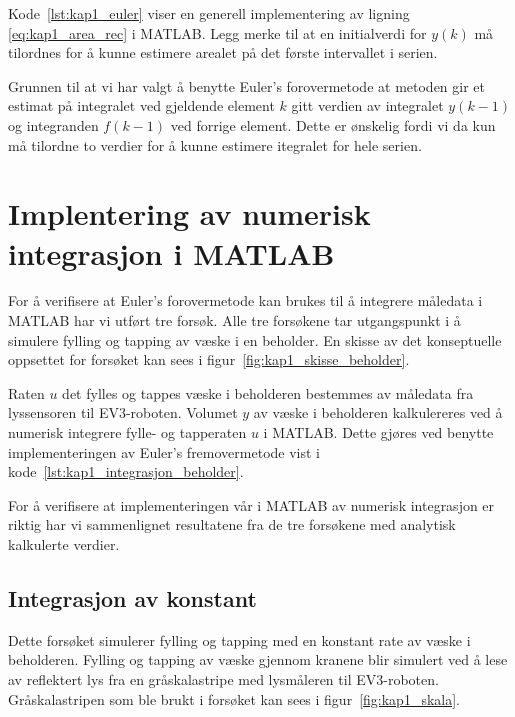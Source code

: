 \documentclass[main.tex]{subfiles}
\begin{document}
Kode~\ref{lst:kap1_euler} viser en generell implementering av ligning \eqref{eq:kap1_area_rec} i \textsc{MATLAB}. Legg merke til at en initialverdi for $y(k)$ må tilordnes for å kunne estimere arealet på det første intervallet i serien.



Grunnen til at vi har valgt å benytte Euler's forovermetode at metoden gir et estimat på integralet ved gjeldende element $k$ gitt verdien av integralet $y(k-1)$ og integranden $f(k-1)$ ved forrige element. Dette er ønskelig fordi vi da kun må tilordne to verdier for å kunne estimere itegralet for hele serien.

\section{Implentering av numerisk integrasjon i \textsc{MATLAB}}

For å verifisere at Euler's forovermetode kan brukes til å integrere måledata i \textsc{MATLAB} har vi utført tre forsøk. Alle tre forsøkene tar utgangspunkt i å simulere fylling og tapping av væske i en beholder. En skisse av det konseptuelle oppsettet for forsøket kan sees i figur~\ref{fig:kap1_skisse_beholder}.



Raten $u$ det fylles og tappes væske i beholderen bestemmes av måledata fra lyssensoren til \textsc{EV3}-roboten. Volumet $y$ av væske i beholderen kalkulereres ved å numerisk integrere fylle- og tapperaten $u$ i \textsc{MATLAB}. Dette gjøres ved benytte implementeringen av Euler's fremovermetode vist i kode~\ref{lst:kap1_integrasjon_beholder}.



For å verifisere at implementeringen vår i \textsc{MATLAB} av numerisk integrasjon er riktig har vi sammenlignet resultatene fra de tre forsøkene med analytisk kalkulerte verdier.

\subsection{Integrasjon av konstant}\label{sub:kap1_integrasjon_konstant}

Dette forsøket simulerer fylling og tapping med en konstant rate av væske i beholderen. Fylling og tapping av væske gjennom kranene blir simulert ved å lese av reflektert lys fra en gråskalastripe med lysmåleren til \textsc{EV3}-roboten. Gråskalastripen som ble brukt i forsøket kan sees i figur~\ref{fig:kap1_skala}.
\end{document}
